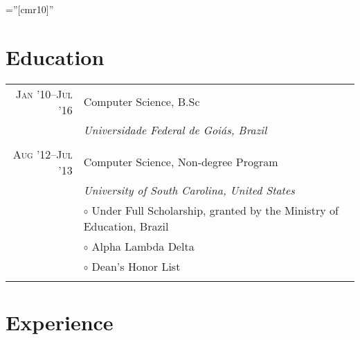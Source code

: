 \documentclass[a4paper,10pt]{article}
\begin{document}
\font\fb=''[cmr10]''


\section{Education}

\begin{tabular}{r|p{11cm}}

  \textsc{Jan '10--Jul '16} & Computer Science, B.Sc\\ &
  \emph{Universidade Federal de Goiás, Brazil}
  \\\multicolumn{2}{c}{} \\

  \textsc{Aug '12--Jul '13} & Computer Science, Non-degree Program \\ &
  \emph{University of South Carolina, United States} \\ &
  \footnotesize{$\circ$ Under Full Scholarship, granted by the Ministry of Education, Brazil} \\ &
  \footnotesize{$\circ$ Alpha Lambda Delta} \\ &
  \footnotesize{$\circ$ Dean's Honor List}
  \\\multicolumn{2}{c}{} \\
 
\end{tabular}

\section{Experience}

\setlength{\LTpre}{0pt}
\setlength{\LTpost}{0pt}
\end{document}
